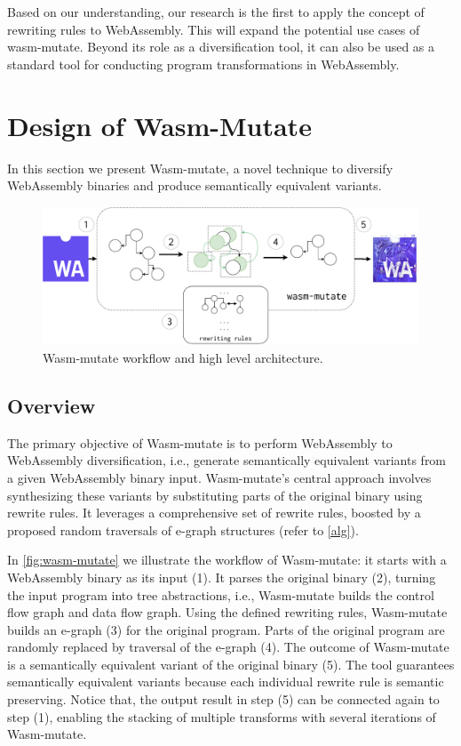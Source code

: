 \documentclass[sigplan,screen]{acmart}
\newcommand{\tool}{Wasm-mutate\xspace}
\begin{document}
Based on our understanding, our research is the first to apply the concept of rewriting rules to WebAssembly.
This will expand the potential use cases of wasm-mutate. 
Beyond its role as a diversification tool, it can also be used as a standard tool for conducting program transformations in WebAssembly.


\section {Design of Wasm-Mutate}
\label{tech}

In this section we present \tool, a novel technique to diversify
WebAssembly binaries and produce semantically equivalent variants.

\begin{figure}[h!]
    \centering
    \includegraphics[width=0.8\linewidth]{figures/wasm-mutate-general.pdf}
    \caption{ \tool workflow and high level architecture.}
  \label{fig:wasm-mutate}
\end{figure}

\subsection{Overview}
The primary objective of \tool is to perform WebAssembly to WebAssembly diversification, i.e., generate semantically equivalent variants from a given WebAssembly binary input. 
\tool's central approach involves synthesizing these variants by substituting parts of the original binary using rewrite rules. 
It leverages a comprehensive set of rewrite rules, boosted by a proposed random traversals of e-graph structures (refer to \autoref{alg}).


In \autoref{fig:wasm-mutate} we illustrate the workflow of \tool: it starts with a WebAssembly binary as its input (1).
It parses the original binary (2), turning the input program into tree abstractions, i.e., \tool builds the control flow graph and data flow graph. 
Using the defined rewriting rules, \tool builds an e-graph (3) for the original program.
Parts of the original program are randomly replaced by traversal of the e-graph (4).
The outcome of \tool is a semantically equivalent variant of the original binary (5).
The tool guarantees semantically equivalent variants because each individual rewrite rule is semantic preserving.
Notice that, the output result in step (5) can be connected again to step (1), enabling the stacking of multiple transforms with several iterations of \tool. 
\end{document}
